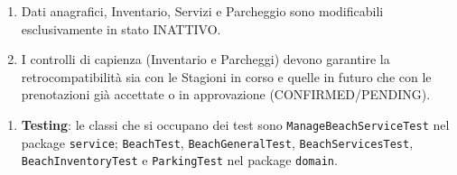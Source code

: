 \documentclass{article}
\begin{document}
	{
		\begin{enumerate}[nosep, leftmargin=*]
			\item[•] Dati anagrafici, Inventario, Servizi e Parcheggio sono modificabili esclusivamente in stato INATTIVO.
			\item[•] I controlli di capienza (Inventario e Parcheggi) devono garantire la retrocompatibilità sia con le Stagioni in corso e quelle in futuro che con le prenotazioni già accettate o in approvazione (CONFIRMED/PENDING).
		\end{enumerate}
		
		\begin{enumerate}[leftmargin=*]
			\item[•] \textbf{Testing}: le classi che si occupano dei test sono \texttt{ManageBeachServiceTest} nel package \texttt{service}; \texttt{BeachTest}, \texttt{BeachGeneralTest}, \texttt{BeachServicesTest}, \texttt{BeachInventoryTest} e \texttt{ParkingTest} nel package \texttt{domain}.
		\end{enumerate}
	}
		
	\newpage
	
\end{document}
